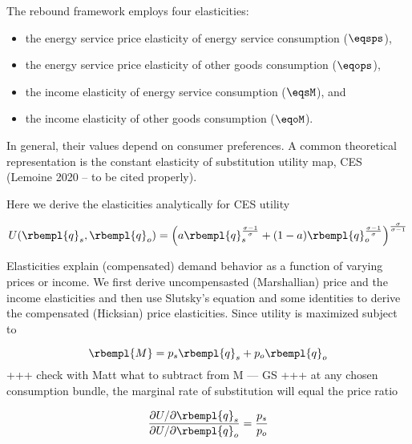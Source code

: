 

The rebound framework employs four elasticities:
%
\begin{itemize}

  \item the energy service price elasticity of energy service consumption ($\eqsps$),

  \item the energy service price elasticity of other goods consumption ($\eqops$), 
  
  \item the income elasticity of energy service consumption ($\eqsM$), and 
  
  \item the income elasticity of other goods consumption ($\eqoM$).

\end{itemize}
%
In general, their values depend on consumer preferences.
A common theoretical representation is the constant elasticity
of substitution utility map, CES (Lemoine 2020 -- to be cited properly).

Here we derive the elasticities analytically for CES utility

\begin{equation}
  U(\rbempl{q}_s,\rbempl{q}_o) = 
      \left( a \rbempl{q}_s^{\frac{\sigma-1}{\sigma}} + (1-a) \rbempl{q}_o^{\frac{\sigma-1}{\sigma}}\right)                ^{\frac{\sigma}{\sigma-1}}
\end{equation}

Elasticities explain (compensated) demand behavior as a function of varying prices or income.
We first derive uncompensasted (Marshallian) price and the income elasticities
and then use Slutsky's equation and some identities to derive the
compensated (Hicksian) price elasticities.
Since utility is maximized subject to 

\begin{equation}
  \rbempl{M} = p_s \rbempl{q}_s + p_o\rbempl{q}_o 
\end{equation}
%
+++ check with Matt what to subtract from M --- GS +++
at any chosen consumption bundle, the marginal rate of substitution will
equal the price ratio

\begin{equation}
 \frac {\partial U / \partial \rbempl{q}_s}{\partial U / \partial \rbempl{q}_o} =
 \frac{ p_s }{ p_o}
\end{equation}

